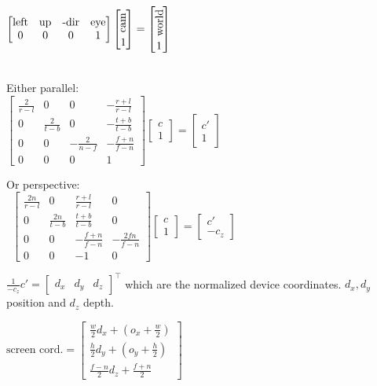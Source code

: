     \(\begin{bmatrix}
      \text{left} & \text{up} & \text{-dir} & \text{eye} \\ 0 & 0 & 0 & 1
    \end{bmatrix} \begin{bmatrix}
      \rotatebox{90}{cam } \\ 1
    \end{bmatrix} = \begin{bmatrix}
      \rotatebox{90}{world } \\ 1
    \end{bmatrix}\)

  \ \\
  Either parallel:\\
  \(\begin{bmatrix}
    \frac{2}{r -l} & 0 & 0 & - \frac{r + l}{r - l} \\
    0 & \frac{2}{t - b} & 0 & - \frac{t + b}{t - b} \\
    0 & 0 & - \frac{2}{n - f} & - \frac{f + n}{f - n} \\
    0 & 0 & 0 & 1
  \end{bmatrix} \begin{bmatrix}
    c \\ 1
  \end{bmatrix} = \begin{bmatrix}
    c' \\ 1
  \end{bmatrix}\)

  Or perspective:\\
  \
  \(\begin{bmatrix}
    \frac{2n}{r - l} & 0 & \frac{r + l}{r - l} & 0 \\
    0 & \frac{2n}{t - b} & \frac{t + b}{t - b} & 0 \\
    0 & 0 & - \frac{f + n}{f - n} & - \frac{2 f n}{f - n} \\
    0 & 0 & -1 & 0
  \end{bmatrix} \begin{bmatrix}
    c \\ 1
  \end{bmatrix} = \begin{bmatrix}
    c' \\ -c_z
  \end{bmatrix}\)


  \(\frac{1}{- c_z}c' = \begin{bmatrix}
      d_x & d_y & d_z
  \end{bmatrix}^\top\)
  which are the normalized device coordinates. \(d_x, d_y\) position and \(d_z\) depth.


  \(\text{screen cord.} = \begin{bmatrix}
    \frac{w}{2}d_x + (o_x  + \frac{w}{2}) \\
    \frac{h}{2}d_y + (o_y + \frac{h}{2}) \\
    \frac{f - n}{2}d_z + \frac{f + n}{2}
  \end{bmatrix}\)
